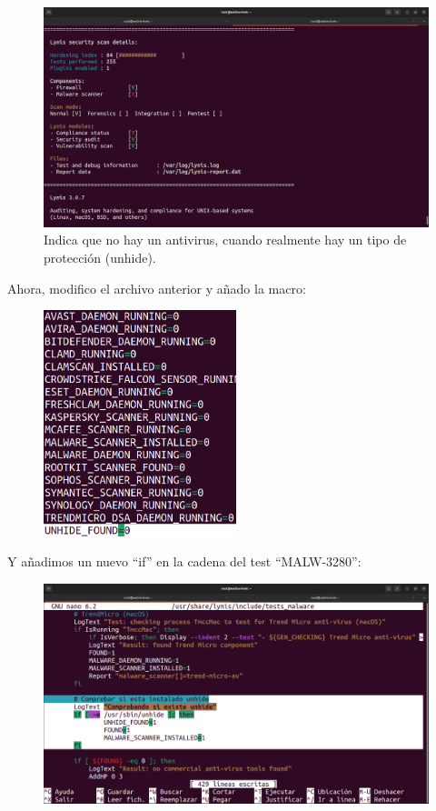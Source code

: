 \documentclass{article}
\begin{document}
\begin{figure}[H]
    \includegraphics[width=\textwidth]{imagenes/lynisresults3unhide.png}
    \caption{Indica que no hay un antivirus, cuando realmente hay un tipo de protección (unhide).}
\end{figure}

\newpage

Ahora, modifico el archivo anterior y añado la macro:

\begin{figure}[H]
    \centering
    \includegraphics[width=0.5\textwidth]{imagenes/macro.png}
\end{figure}

\bigskip

Y añadimos un nuevo ``if'' en la cadena del test ``MALW-3280'':

\begin{figure}[H]
    \includegraphics[width=\textwidth]{imagenes/unhidetest.png}
\end{figure}
\end{document}
